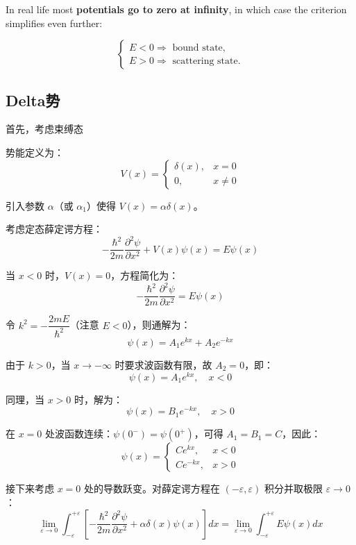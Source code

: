 In real life most \textbf{potentials go to zero at infinity}, in which case the criterion simplifies even further:

\begin{equation*}
	\begin{cases}
		E < 0 \Rightarrow \text{ bound state,} \\
		E > 0 \Rightarrow \text{ scattering state.}
	\end{cases}
\end{equation*}



\subsection{Delta势}
首先，考虑束缚态

势能定义为：
\[
V(x) = \begin{cases}
	\delta(x), & x = 0 \\
	0, & x \neq 0
\end{cases}
\]

引入参数 $\alpha$（或 $\alpha_1$）使得 $V(x) = \alpha \delta(x)$。

考虑定态薛定谔方程：
\[
-\frac{\hbar^2}{2m} \frac{\partial^2 \psi}{\partial x^2} + V(x) \psi(x) = E \psi(x)
\]

当 $x < 0$ 时，$V(x) = 0$，方程简化为：
\[
-\frac{\hbar^2}{2m} \frac{\partial^2 \psi}{\partial x^2} = E \psi(x)
\]

令 $k^2 = -\dfrac{2mE}{\hbar^2}$（注意 $E < 0$），则通解为：
\[
\psi(x) = A_1 e^{kx} + A_2 e^{-kx}
\]

由于 $k > 0$，当 $x \to -\infty$ 时要求波函数有限，故 $A_2 = 0$，即：
\[
\psi(x) = A_1 e^{kx}, \quad x < 0
\]

同理，当 $x > 0$ 时，解为：
\[
\psi(x) = B_1 e^{-kx}, \quad x > 0
\]

在 $x = 0$ 处波函数连续：$\psi(0^-) = \psi(0^+)$，可得 $A_1 = B_1 = C$，因此：
\[
\psi(x) = 
\begin{cases}
	C e^{kx}, & x < 0 \\
	C e^{-kx}, & x > 0
\end{cases}
\]

接下来考虑 $x = 0$ 处的导数跃变。对薛定谔方程在 $(-\varepsilon, \varepsilon)$ 积分并取极限 $\varepsilon \to 0$：
\[
\lim_{\varepsilon \to 0} \int_{-\varepsilon}^{+\varepsilon} \left[ -\frac{\hbar^2}{2m} \frac{\partial^2 \psi}{\partial x^2} + \alpha \delta(x) \psi(x) \right] dx = \lim_{\varepsilon \to 0} \int_{-\varepsilon}^{+\varepsilon} E \psi(x) dx
\]

